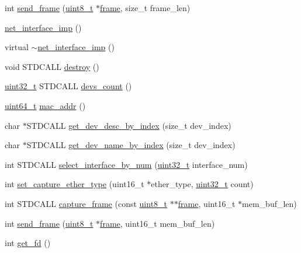 \begin{DoxyCompactItemize}
\item 
int \hyperlink{classavdecc__lib_1_1net__interface__imp_aae96ba5931306aeabaf7f09d71fae26b}{send\+\_\+frame} (\hyperlink{stdint_8h_aba7bc1797add20fe3efdf37ced1182c5}{uint8\+\_\+t} $\ast$\hyperlink{gst__avb__playbin_8c_ac8e710e0b5e994c0545d75d69868c6f0}{frame}, size\+\_\+t frame\+\_\+len)
\item 
\hyperlink{classavdecc__lib_1_1net__interface__imp_a3bf5c0e9fa4e81aa32795b5ddae22694}{net\+\_\+interface\+\_\+imp} ()
\item 
virtual \hyperlink{classavdecc__lib_1_1net__interface__imp_a3c594dd9f132950a397d015bb3d1d95f}{$\sim$net\+\_\+interface\+\_\+imp} ()
\item 
void S\+T\+D\+C\+A\+LL \hyperlink{classavdecc__lib_1_1net__interface__imp_a644cfaa829dbec5c28d5d29a6789e8c4}{destroy} ()
\item 
\hyperlink{parse_8c_a6eb1e68cc391dd753bc8ce896dbb8315}{uint32\+\_\+t} S\+T\+D\+C\+A\+LL \hyperlink{classavdecc__lib_1_1net__interface__imp_a779d955a4fe34cff088021f802e150c2}{devs\+\_\+count} ()
\item 
\hyperlink{parse_8c_aec6fcb673ff035718c238c8c9d544c47}{uint64\+\_\+t} \hyperlink{classavdecc__lib_1_1net__interface__imp_a742e975c065f9067f42182847df080da}{mac\+\_\+addr} ()
\item 
char $\ast$S\+T\+D\+C\+A\+LL \hyperlink{classavdecc__lib_1_1net__interface__imp_a14eb1eb2e2ef2c9cbbdfc2412639ab9b}{get\+\_\+dev\+\_\+desc\+\_\+by\+\_\+index} (size\+\_\+t dev\+\_\+index)
\item 
char $\ast$S\+T\+D\+C\+A\+LL \hyperlink{classavdecc__lib_1_1net__interface__imp_af6226f815d122be5f9d80c42a71c2f6a}{get\+\_\+dev\+\_\+name\+\_\+by\+\_\+index} (size\+\_\+t dev\+\_\+index)
\item 
int S\+T\+D\+C\+A\+LL \hyperlink{classavdecc__lib_1_1net__interface__imp_ab8d35d1767e1df005964f2ef912f085e}{select\+\_\+interface\+\_\+by\+\_\+num} (\hyperlink{parse_8c_a6eb1e68cc391dd753bc8ce896dbb8315}{uint32\+\_\+t} interface\+\_\+num)
\item 
int \hyperlink{classavdecc__lib_1_1net__interface__imp_a11723236c6bc4f4b0c152ceb0c44b786}{set\+\_\+capture\+\_\+ether\+\_\+type} (uint16\+\_\+t $\ast$ether\+\_\+type, \hyperlink{parse_8c_a6eb1e68cc391dd753bc8ce896dbb8315}{uint32\+\_\+t} count)
\item 
int S\+T\+D\+C\+A\+LL \hyperlink{classavdecc__lib_1_1net__interface__imp_a52700aecb2987cd1b864f50991089a9b}{capture\+\_\+frame} (const \hyperlink{stdint_8h_aba7bc1797add20fe3efdf37ced1182c5}{uint8\+\_\+t} $\ast$$\ast$\hyperlink{gst__avb__playbin_8c_ac8e710e0b5e994c0545d75d69868c6f0}{frame}, uint16\+\_\+t $\ast$mem\+\_\+buf\+\_\+len)
\item 
int \hyperlink{classavdecc__lib_1_1net__interface__imp_ac1a430cb59bcfc3b43ed26b624db5dea}{send\+\_\+frame} (\hyperlink{stdint_8h_aba7bc1797add20fe3efdf37ced1182c5}{uint8\+\_\+t} $\ast$\hyperlink{gst__avb__playbin_8c_ac8e710e0b5e994c0545d75d69868c6f0}{frame}, uint16\+\_\+t mem\+\_\+buf\+\_\+len)
\item 
int \hyperlink{classavdecc__lib_1_1net__interface__imp_ac46dfce80aaa93ac5fbb8df77bcdb6ce}{get\+\_\+fd} ()
\end{DoxyCompactItemize}
